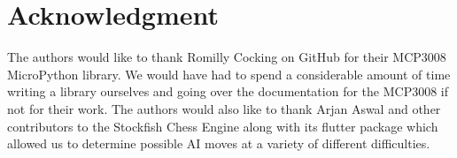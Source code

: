 \documentclass[11pt,journal]{IEEEtran}
\begin{document}
\section*{Acknowledgment}

The authors would like to thank Romilly Cocking on GitHub for their MCP3008 MicroPython library. We would have had to spend a considerable amount of time writing a library ourselves and going over the documentation for the MCP3008 if not for their work.\cite{cocking_pico_code_2023} The authors would also like to thank Arjan Aswal and other contributors to the Stockfish Chess Engine along with its flutter package which allowed us to determine possible AI moves at a variety of different difficulties. \cite{stockfish}




\end{document}
